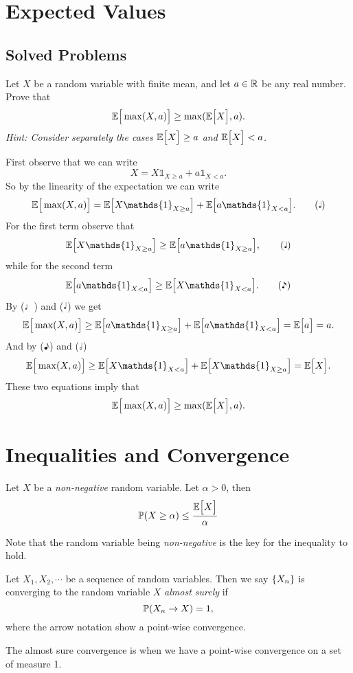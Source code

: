 \section{Expected Values}
\subsection{Solved Problems}
\begin{problem}
	Let $ X $ be a random variable with finite mean, and let $ a\in \mathbb{R} $ be any real number. Prove that 
	\[ \mathbb{E}\big[\max(X,a)\big] \geq \max(\mathbb{E}\big[X\big],a). \]
	\emph{Hint: Consider separately the cases $ \mathbb{E}\big[X\big]\geq a $ and $ \mathbb{E}\big[X\big]<a $.}
\end{problem}
\begin{solution}
	First observe that we can write
	$$ X = X \mathds{1}_{X\geq a} + a \mathds{1}_{X<a}. $$
	So by the linearity of the expectation we can write
	\[\E{\max(X,a)} = \E{X\mathds{1}_{X\geq a}} + \E{a\mathds{1}_{X<a}}. \tag{\halfnote}\]
	For the first term observe that 
	\[ \E{X\mathds{1}_{X\geq a}} \geq \E{a\mathds{1}_{X\geq a}}, \tag{\quarternote} \]
	while for the second term
	\[ \E{a\mathds{1}_{X< a}} \geq \E{X\mathds{1}_{X< a}}. \tag{\eighthnote}\]
	By ($ \quarternote $) and ($ \halfnote $) we get
	\[ \E{\max(X,a)} \geq \E{a\mathds{1}_{X\geq a}} + \E{a\mathds{1}_{X<a}} = \E{a} = a. \]
	And by ($ \eighthnote $) and ($ \halfnote $)
	\[ \E{\max(X,a)} \geq \E{X\mathds{1}_{X< a}} + \E{X\mathds{1}_{X\geq a}} = \E{X}. \]
	These two equations imply that
	\[ \mathbb{E}\big[\max(X,a)\big] \geq \max(\mathbb{E}\big[X\big],a). \]
\end{solution}




\section{Inequalities and Convergence}
\begin{proposition}
	Let $ X $ be a \emph{non-negative} random variable. Let $ \alpha > 0 $, then
	\[ \mathbb{P}(X\geq \alpha)\leq \frac{\mathbb{E}\big[X\big]}{\alpha} \]
\end{proposition}

\begin{remark}
	Note that the random variable being \emph{non-negative} is the key for the inequality to hold.
\end{remark}

\begin{definition}
	Let $ X_1,X_2,\cdots $ be a sequence of random variables. Then we say $ \{X_n\} $ is converging to the random variable $ X $ \emph{almost surely} if
	\[ \mathbb{P}(X_n \to X) = 1, \]
	where the arrow notation show a point-wise convergence. 
\end{definition}
\begin{remark}
	The almost sure convergence is when we have a point-wise convergence on a set of measure 1.
\end{remark}

